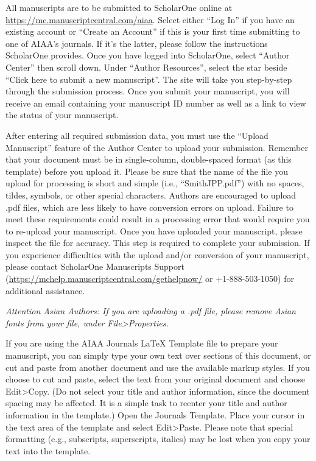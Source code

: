 All manuscripts are to be submitted to ScholarOne online at \url{https://mc.manuscriptcentral.com/aiaa}. Select either “Log In” if you have an existing account or “Create an Account” if this is your first time submitting to one of AIAA’s journals. If it’s the latter, please follow the instructions ScholarOne provides. Once you have logged into ScholarOne, select “Author Center” then scroll down. Under “Author Resources”, select the star beside “Click here to submit a new manuscript”. The site will take you step-by-step through the submission process. Once you submit your manuscript, you will receive an email containing your manuscript ID number as well as a link to view the status of your manuscript. 

After entering all required submission data, you must use the “Upload Manuscript” feature of the Author Center to upload your submission. Remember that your document must be in single-column, double-spaced format (as this template) before you upload it. Please be sure that the name of the file you upload for processing is short and simple (i.e., “SmithJPP.pdf”) with no spaces, tildes, symbols, or other special characters. Authors are encouraged to upload .pdf files, which are less likely to have conversion errors on upload. Failure to meet these requirements could result in a processing error that would require you to re-upload your manuscript. Once you have uploaded your manuscript, please inspect the file for accuracy. This step is required to complete your submission. If you experience difficulties with the upload and/or conversion of your manuscript, please contact ScholarOne Manuscripts Support (\url{https://mchelp.manuscriptcentral.com/gethelpnow/} or +1-888-503-1050) for additional assistance. 

\emph{Attention Asian Authors: If you are uploading a .pdf file, please remove Asian fonts from your file, under File>Properties.}


If you are using the AIAA Journals \LaTeX{} Template file to prepare your manuscript, you can simply type your own text over sections of this document, or cut and paste from another document and use the available markup styles. If you choose to cut and paste, select the text from your original document and choose Edit>Copy. (Do not select your title and author information, since the document spacing may be affected. It is a simple task to reenter your title and author information in the template.) Open the Journals Template. Place your cursor in the text area of the template and select Edit>Paste. Please note that special formatting (e.g., subscripts, superscripts, italics) may be lost when you copy your text into the template.

